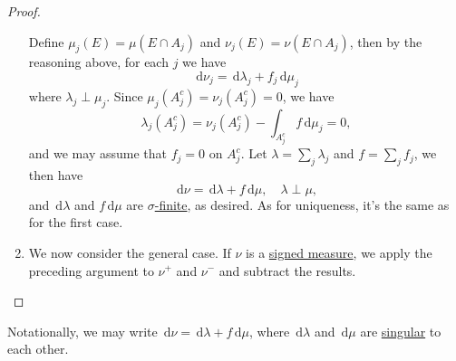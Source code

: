 \begin{proof}
\begin{enumerate}
		      Define \(\mu _{j} (E) = \mu (E \cap A_{j} )\) and \(\nu _{j} (E)= \nu (E \cap A_{j} )\), then by the reasoning above, for each \(j\) we have
		      \[
			      \,\mathrm{d} \nu _{j} = \,\mathrm{d} \lambda _{j} + f_{j} \,\mathrm{d} \mu _{j}
		      \]
		      where \(\lambda _{j} \perp \mu _{j} \). Since \(\mu _{j} (A^{c} _{j} ) = \nu _{j} (A^{c} _{j} ) = 0\), we have
		      \[
			      \lambda _{j} (A^{c} _{j} ) = \nu _{j} (A^{c} _{j} )- \int _{A^{c} _{j} }f \,\mathrm{d} \mu _{j} = 0,
		      \]
		      and we may assume that \(f_{j} = 0\) on \(A^{c} _{j} \). Let \(\lambda = \sum_j \lambda _{j} \) and \(f = \sum_{j}f_{j}  \), we then have
		      \[
			      \,\mathrm{d} \nu = \,\mathrm{d} \lambda + f \,\mathrm{d} \mu , \quad \lambda \perp \mu ,
		      \]
		      and \(\,\mathrm{d} \lambda \) and \(f \,\mathrm{d} \mu \) are \hyperref[def:finite-signed-measure]{\(\sigma \)-finite}, as desired. As for uniqueness, it's the same
		      as for the first case.
		\item We now consider the general case. If \(\nu\) is a \hyperref[def:signed-measure]{signed measure}, we apply the preceding argument to \(\nu ^+\) and
		      \(\nu ^-\) and subtract the results.
	\end{enumerate}
\end{proof}
\begin{remark}
	Notationally, we may write \(\,\mathrm{d} \nu = \,\mathrm{d} \lambda + f \,\mathrm{d} \mu\), where \(\,\mathrm{d} \lambda\)
	and \(\,\mathrm{d} \mu\) are \hyperref[def:singular]{singular} to each other.
\end{remark}